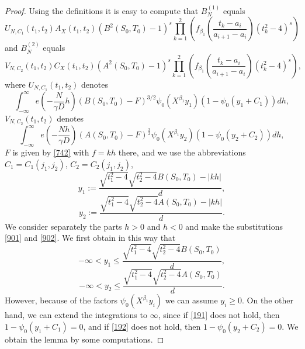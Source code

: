 \documentclass[12pt]{amsart}
\theoremstyle{definition}
\numberwithin{equation}{section}
\begin{document}
\begin{proof}Using the definitions it is easy to compute that $B_
N^{(1)}$ equals
\[U_{N,C_1}\left(t_1,t_2\right)A_X\left(t_1,t_2\right)\left(B^2\left
(S_0,T_0\right)-1\right)^s\prod_{k=1}^2\left(f_{\beta_1}\left(\frac {
t_k-a_i}{a_{i+1}-a_i}\right)\left(t_k^2-4\right)^s\right)\]
and $B_N^{(2)}$ equals
\[V_{N,C_2}\left(t_1,t_2\right)C_X\left(t_1,t_2\right)\left(A^2\left
(S_0,T_0\right)-1\right)^s\prod_{k=1}^2\left(f_{\beta_1}\left(\frac {
t_k-a_i}{a_{i+1}-a_i}\right)\left(t_k^2-4\right)^s\right),\]
where $U_{N,C_1}\left(t_1,t_2\right)$ denotes
\[\int_{-\infty}^{\infty}e\left(-\frac N{\gamma D}h\right)\left(B\left
(S_0,T_0\right)-F\right)^{3/2}\psi_0\left(X^{\beta_1}y_1\right)\left
(1-\psi_0\left(y_1+C_1\right)\right)dh,\]
$V_{N,C_2}\left(t_1,t_2\right)$ denotes
\[\int_{-\infty}^{\infty}e\left(-\frac {Nh}{\gamma D}\right)\left
(A\left(S_0,T_0\right)-F\right)^{\frac 32}\psi_0\left(X^{\beta_1}
y_2\right)\left(1-\psi_0\left(y_2+C_2\right)\right)dh,\]
$F$ is given by \eqref{742} with $f=kh$ there, and we use
the abbreviations $C_1=C_1\left(j_1,j_2\right)$, $C_2=C_2\left(j_
1,j_2\right)$,
\begin{equation}y_1:=\frac {\sqrt {t_1^2-4}\sqrt {t_2^2-4}B\left(
S_0,T_0\right)-\left|kh\right|}d,\label{901}\end{equation}
\begin{equation}y_2:=\frac {\sqrt {t_1^2-4}\sqrt {t_2^2-4}A\left(
S_0,T_0\right)-\left|kh\right|}d.\label{902}\end{equation}
We consider separately the parts $h>0$ and $h<0$ and
make the substitutions \eqref{901} and \eqref{902}. We
first obtain in this way that
\begin{equation}-\infty <y_1\le\frac {\sqrt {t_1^2-4}\sqrt {t_2^2
-4}B\left(S_0,T_0\right)}d,\label{191}\end{equation}
\begin{equation}-\infty <y_2\le\frac {\sqrt {t_1^2-4}\sqrt {t_2^2
-4}A\left(S_0,T_0\right)}d.\label{192}\end{equation}
However, because of the factors $\psi_0\left(X^{\beta_1}y_i\right
)$ we can
assume $y_i\ge 0$. On the other hand, we can extend the
integrations to $\infty$, since if \eqref{191} does not hold, then
$1-\psi_0\left(y_1+C_1\right)=0$, and if \eqref{192} does not hold, then
$1-\psi_0\left(y_2+C_2\right)=0$. We obtain the lemma by some computations.
\end{proof}
\end{document}
